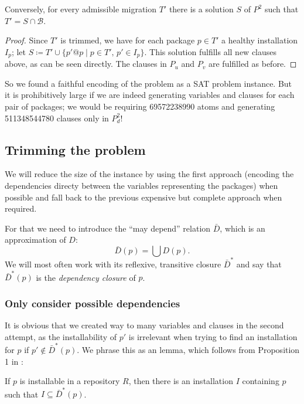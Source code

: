 \documentclass[halfparskip,11pt]{scrartcl}
\begin{document}
Conversely, for every admissible migration $T'$ there is a solution $S$ of $P^2$ such that $T' = S \cap \mathcal B$.

\begin{proof}
Since $T'$ is trimmed, we have for each package $p\in T'$ a healthy installation $I_p$; let $S \coloneqq T' \cup \{p'@p \mid p\in T',\, p'\in I_p\}$. This solution fulfills all new clauses above, as can be seen directly. The clauses in $P_u$ and $P_v$ are fulfilled as before.
\end{proof}

So we found a faithful encoding of the problem as a SAT problem instance. But it is prohibitively large if we are indeed generating variables and clauses for each pair of packages; we would be requiring 69572238990 atoms and generating 511348544780 clauses only in $P^2_d$!

\subsection{Trimming the problem}

We will reduce the size of the instance by using the first approach (encoding the dependencies directy between the variables representing the packages) when possible and fall back to the previous expensive but complete approach when required.

For that we need to introduce the “may depend” relation $\bar D$, which is an approximation of $D$:
\[
\bar D(p) = \bigcup D(p).
\]
We will most often work with its reflexive, transitive closure $\bar D^*$ and say that $\bar D^*(p)$ is the \emph{dependency closure} of $p$.

\subsubsection{Only consider possible dependencies}

It is obvious that we created way to many variables and clauses in the second attempt, as the installability of $p'$ is irrelevant when trying to find an installation for $p$ if $p'\notin \bar D^*(p)$. We phrase this as an lemma, which follows from Proposition 1 in \cite{edos}:
\begin{lemma}
If $p$ is installable in a repository $R$, then there is an installation $I$ containing $p$ such that $I\subseteq \bar D^*(p)$.
\label{instrestr}
\end{lemma}
\end{document}
